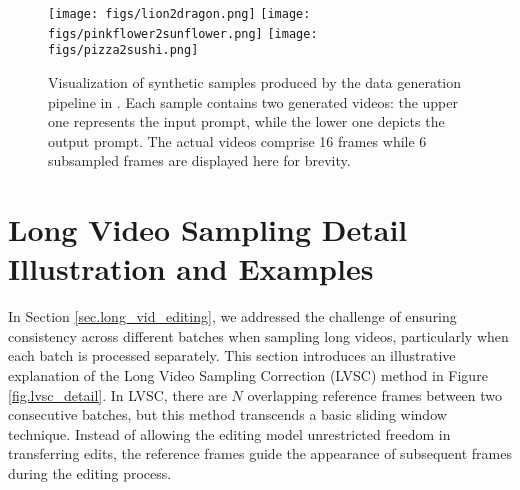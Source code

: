 \begin{figure}
    \centering
    \texttt{[image: figs/lion2dragon.png]}
    \texttt{[image: figs/pinkflower2sunflower.png]}
    \texttt{[image: figs/pizza2sushi.png]}
    \caption{Visualization of synthetic samples produced by the data generation pipeline in . Each sample contains two generated videos: the upper one represents the input prompt, while the lower one depicts the output prompt. The actual videos comprise 16 frames while 6 subsampled frames are displayed here for brevity.}
    \label{fig.synthetic_vid2}
\end{figure}



\section{Long Video Sampling Detail Illustration and Examples}\label{sec.long_vid_editing_appendix}
In Section \ref{sec.long_vid_editing}, we addressed the challenge of ensuring consistency across different batches when sampling long videos, particularly when each batch is processed separately. This section introduces an illustrative explanation of the Long Video Sampling Correction (LVSC) method in Figure \ref{fig.lvsc_detail}. In LVSC, there are $N$ overlapping reference frames between two consecutive batches, but this method transcends a basic sliding window technique. Instead of allowing the editing model unrestricted freedom in transferring edits, the reference frames guide the appearance of subsequent frames during the editing process.

